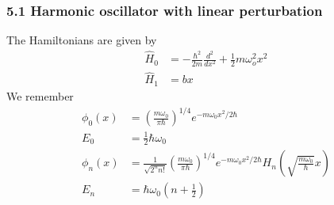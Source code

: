 \documentclass[10pt,a4paper]{article}
\theoremstyle{definition}
\begin{document}
\subsubsection{5.1 Harmonic oscillator with linear perturbation}
The Hamiltonians are given by
\begin{align}
\hat{H}_0&=-\frac{\hbar^2}{2m}\frac{d^2}{dx^2}+\frac{1}{2}m\omega_o^2x^2\\
\hat{H}_1&=bx
\end{align}
We remember
\begin{align}
\phi_0(x)&=\left(\frac{m\omega_0}{\pi\hbar}\right)^{1/4}e^{-m\omega_0x^2/2\hbar}\\
E_0&=\frac{1}{2}\hbar\omega_0\\
\phi_n(x)&=\frac{1}{\sqrt{2^n n!}}\left(\frac{m\omega_0}{\pi\hbar}\right)^{1/4}e^{-m\omega_0x^2/2\hbar}H_n\left(\sqrt{\frac{m\omega_0}{\hbar}}x\right)\\
E_n&=\hbar\omega_0\left(n+\frac{1}{2}\right)
\end{align}
\end{document}
